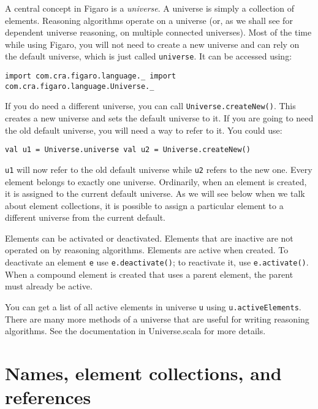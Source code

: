 A central concept in Figaro is a \emph{universe}. A universe is simply a collection of elements. Reasoning algorithms operate on a universe (or, as we shall see for dependent universe reasoning, on multiple connected universes). Most of the time while using Figaro, you will not need to create a new universe and can rely on the default universe, which is just called \texttt{universe}. It can be accessed using:

\begin{flushleft}
\texttt{import com.cra.figaro.language.\_
\newline import com.cra.figaro.language.Universe.\_}
\end{flushleft}

If you do need a different universe, you can call \texttt{Universe.create\-New()}. This creates a new universe and sets the default universe to it. If you are going to need the old default universe, you will need a way to refer to it. You could use:

\begin{flushleft}
\texttt{val u1 = Universe.universe
\newline val u2 = Universe.createNew()}
\end{flushleft}

\texttt{u1} will now refer to the old default universe while \texttt{u2} refers to the new one. Every element belongs to exactly one universe. Ordinarily, when an element is created, it is assigned to the current default universe. As we will see below when we talk about element collections, it is possible to assign a particular element to a different universe from the current default.

Elements can be activated or deactivated. Elements that are inactive are not operated on by reasoning algorithms. Elements are active when created. To deactivate an element \texttt{e} use \texttt{e.deactivate()}; to reactivate it, use \texttt{e.activate()}. When a compound element is created that uses a parent element, the parent must already be active.

You can get a list of all active elements in universe \texttt{u} using \texttt{u.active\-Elements}. There are many more methods of a universe that are useful for writing reasoning algorithms. See the documentation in Universe.scala for more details.

\section{Names, element collections, and references}

